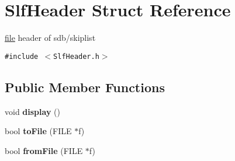 \hypertarget{structSlfHeader}{
\section{SlfHeader Struct Reference}
\label{structSlfHeader}
}
\hyperlink{classfile}{file} header of sdb/skiplist  


{\tt \#include $<$SlfHeader.h$>$}

\subsection*{Public Member Functions}
\begin{CompactItemize}
\item 
\hypertarget{structSlfHeader_83160e3947a839a4fbda5e5b8cd2f952}{
void \textbf{display} ()}
\label{structSlfHeader_83160e3947a839a4fbda5e5b8cd2f952}

\item 
\hypertarget{structSlfHeader_b3a1013e9bcd0736d12b5d412ca2cc62}{
bool \textbf{toFile} (FILE $\ast$f)}
\label{structSlfHeader_b3a1013e9bcd0736d12b5d412ca2cc62}

\item 
\hypertarget{structSlfHeader_714243a63239b949db0316ebe68420e1}{
bool \textbf{fromFile} (FILE $\ast$f)}
\label{structSlfHeader_714243a63239b949db0316ebe68420e1}

\end{CompactItemize}
